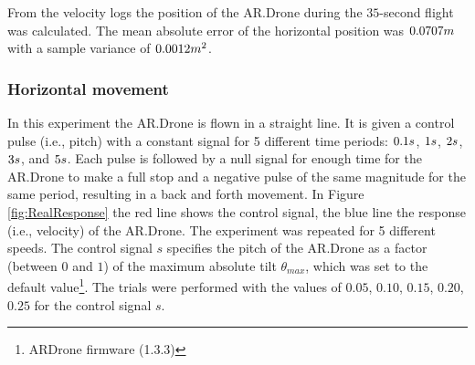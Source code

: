 From the velocity logs the position of the AR.Drone during the $35$-second 
flight was calculated. 
The mean absolute error of the horizontal position was $0.0707\small{m}$ with a sample variance of $0.0012\small{m^2}$.

\subsubsection{Horizontal movement}

In this experiment the AR.Drone is flown in a straight line. It is given a control pulse (i.e., pitch) with a constant signal
for 5 different time periods: $0.1\small{s}$, $1\small{s}$, $2\small{s}$, $3\small{s}$, and $5\small{s}$. Each pulse is followed by a null signal for enough time for the AR.Drone to make a full stop and a negative pulse of the same magnitude for the same period,
resulting in a back and forth movement. In Figure \ref{fig:RealResponse}
 the red line shows the control signal, the blue line the response (i.e., velocity) of the AR.Drone. The experiment was repeated for 5 different speeds.
The control signal $s$ specifies the pitch of the AR.Drone as a factor (between $0$ and $1$) of the maximum absolute tilt $\theta_{max}$, which was set to the default value\footnote{ARDrone firmware (1.3.3)}. %
The trials were performed with the
values of $0.05$, $0.10$, $0.15$, $0.20$, $0.25$ for the control signal $s$.

